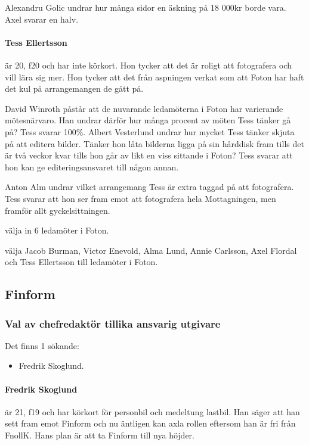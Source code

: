 \documentclass[hidelinks]{sektionsmote}
\begin{document}
Alexandru Golic undrar hur många sidor en äskning på 18 000kr borde vara.
Axel svarar en halv.

\paragraph{Tess Ellertsson} är 20, f20 och har inte körkort.
Hon tycker att det är roligt att fotografera och vill lära sig mer.
Hon tycker att det från aspningen verkat som att Foton har haft det kul på arrangemangen de gått på.

David Winroth påstår att de nuvarande ledamöterna i Foton har varierande mötesnärvaro.
Han undrar därför hur många procent av möten Tess tänker gå på?
Tess svarar 100\%.
Albert Vesterlund undrar hur mycket Tess tänker skjuta på att editera bilder.
Tänker hon låta bilderna ligga på sin hårddisk fram tills det är två veckor kvar tills hon går av likt en viss sittande i Foton?
Tess svarar att hon kan ge editeringsansvaret till någon annan.

Anton Alm undrar vilket arrangemang Tess är extra taggad på att fotografera.
Tess svarar att hon ser fram emot att fotografera hela Mottagningen, men framför allt gyckelsittningen.

\begin{beslut}
  \item välja in 6 ledamöter i Foton.
  \item välja Jacob Burman, Victor Enevold, Alma Lund, Annie Carlsson, Axel Flordal och Tess Ellertsson till ledamöter i Foton.
\end{beslut}


\subsection{Finform}
\subsubsection{Val av chefredaktör tillika ansvarig utgivare}
Det finns 1 sökande:
\begin{itemize}
    \item Fredrik Skoglund.
\end{itemize}

\paragraph{Fredrik Skoglund} är 21, f19 och har körkort för personbil och medeltung lastbil.
Han säger att han sett fram emot Finform och nu äntligen kan axla rollen eftersom han är fri från FnollK.
Hans plan är att ta Finform till nya höjder.
\end{document}
